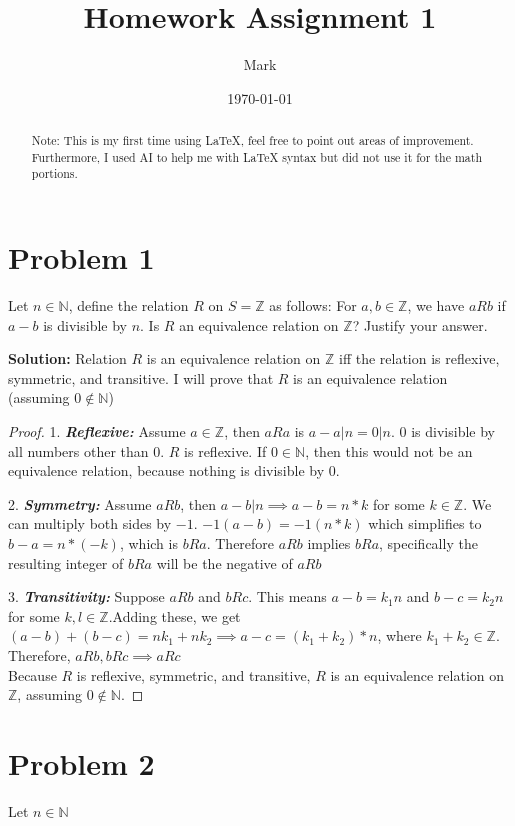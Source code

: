\documentclass{article}
\title{Homework Assignment 1}
\author{Mark}
\date{\today}
\begin{document}
\maketitle

\begin{abstract}
Note: This is my first time using LaTeX, feel free to point out areas of improvement. Furthermore, I used AI to help me with LaTeX syntax but did not use it for the math portions.
\end{abstract}

\section{Problem 1}
Let $n \in \mathbb{N}$, define the relation $R$ on $S = \mathbb{Z}$ as follows: For $a, b \in \mathbb{Z}$, we have $aRb$ if $a - b$ is divisible by $n$. Is $R$ an equivalence relation on $\mathbb{Z}$? Justify your answer.

\noindent \textbf{Solution:} 
Relation $R$ is an equivalence relation on $\mathbb{Z}$ iff the relation is reflexive, symmetric, and transitive. I will prove that $R$ is an equivalence relation (assuming $0\notin\mathbb{N}$)
\begin{proof}

1. \textbf{\textit{Reflexive:}} Assume $a \in \mathbb{Z}$, then $aRa$ is $a-a|n = 0 | n$. 0 is divisible by all numbers other than 0. $R$ is reflexive. If $0\in \mathbb{N}$, then this would not be an equivalence relation, because nothing is divisible by 0.
   
2. \textbf{\textit{Symmetry:}} Assume $aRb$, then $a-b|n \implies a-b=n*k$ for some $k \in \mathbb{Z}$. We can multiply both sides by $-1$. $-1(a-b)=-1(n*k) $ which simplifies to $b-a=n*(-k)$, which is $bRa$. Therefore $aRb$ implies $bRa$, specifically the resulting integer of $bRa$ will be the negative of $aRb$

3. \textbf{\textit{Transitivity:}} Suppose $aRb$ and $bRc$. This means $a - b = k_1n$ and $b - c = k_2n$ for some $k, l \in \mathbb{Z}$.Adding these, we get $(a-b) + (b-c) = nk_1 + nk_2 \implies a-c = (k_1+k_2)*n$, where $k_1+k_2 \in \mathbb{Z}$. Therefore, $aRb, bRc \implies aRc$ \\
   
Because $R$ is reflexive, symmetric, and transitive, $R$ is an equivalence relation on $\mathbb{Z}$, assuming $0 \notin \mathbb{N}$.
\end{proof}

\section{Problem 2}
Let $n \in \mathbb{N}$
\end{document}

